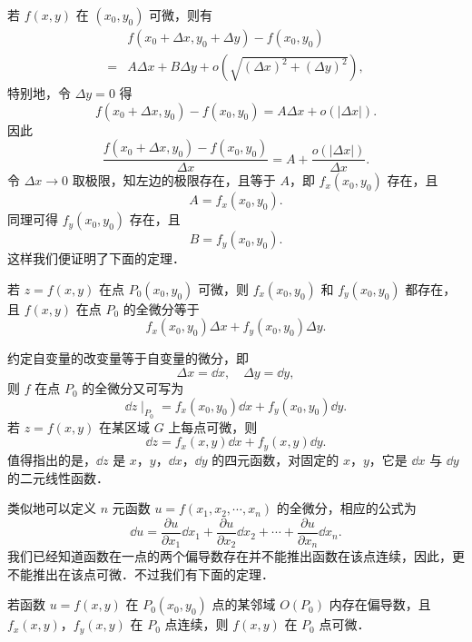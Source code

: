若 $f(x,y)$ 在 $(x_{0},y_{0})$ 可微，则有
\[
\begin{aligned}
&f(x_{0}+\Delta x,y_{0}+\Delta y)-f(x_{0},y_{0})\\
={}&A\Delta x+B\Delta y+o\left(\sqrt{(\Delta x)^{2}+(\Delta y)^{2}}\right),
\end{aligned}
\]
特别地，令 $\Delta y=0$ 得
\[
f(x_{0}+\Delta x,y_{0})-f(x_{0},y_{0})=A\Delta x+o(\left|\Delta x\right|).
\]
因此
\[
\frac{f(x_{0}+\Delta x,y_{0})-f(x_{0},y_{0})}{\Delta x}=A+\frac{o(\left|\Delta x\right|)}{\Delta x}.
\]
令 $\Delta x\to 0$ 取极限，知左边的极限存在，且等于 $A$，即 $f_{x}(x_{0},y_{0})$ 存在，且
\[
A=f_{x}(x_{0},y_{0}).
\]
同理可得 $f_{y}(x_{0},y_{0})$ 存在，且
\[
B=f_{y}(x_{0},y_{0}).
\]
这样我们便证明了下面的定理．

\begin{theorem}\label{thm:16-2}
若 $z=f(x,y)$ 在点 $P_{0}(x_{0},y_{0})$ 可微，则 $f_{x}(x_{0},y_{0})$ 和 $f_{y}(x_{0},y_{0})$ 都存在，且 $f(x,y)$ 在点 $P_{0}$ 的全微分等于
\[
f_{x}(x_{0},y_{0})\Delta x+f_{y}(x_{0},y_{0})\Delta y.
\]
\end{theorem}

约定自变量的改变量等于自变量的微分，即
\[
\Delta x=\dd x,\quad \Delta y=\dd y,
\]
则 $f$ 在点 $P_{0}$ 的全微分又可写为
\[
\dd z\mid_{P_{0}}=f_{x}(x_{0},y_{0})\dd x+f_{y}(x_{0},y_{0})\dd y.
\]
若 $z=f(x,y)$ 在某区域 $G$ 上每点可微，则
\[
\dd z=f_{x}(x,y)\dd x+f_{y}(x,y)\dd y.
\]
值得指出的是，$\dd z$ 是 $x$，$y$，$\dd x$，$\dd y$ 的四元函数，对固定的 $x$，$y$，它是 $\dd x$ 与 $\dd y$ 的二元线性函数．

类似地可以定义 $n$ 元函数 $u=f(x_{1},x_{2},\cdots,x_{n})$ 的全微分，相应的公式为
\[
\dd u=\frac{\partial u}{\partial x_{1}}\dd x_{1}+\frac{\partial u}{\partial x_{2}}\dd x_{2}+\cdots+\frac{\partial u}{\partial x_{n}}\dd x_{n}.
\]
我们已经知道函数在一点的两个偏导数存在并不能推出函数在该点连续，因此，更不能推出在该点可微．不过我们有下面的定理．

\begin{theorem}\label{thm:16-3}
若函数 $u=f(x,y)$ 在 $P_{0}(x_{0},y_{0})$ 点的某邻域 $O(P_{0})$ 内存在偏导数，且 $f_{x}(x,y)$，$f_{y}(x,y)$ 在 $P_{0}$ 点连续，则 $f(x,y)$ 在 $P_{0}$ 点可微．
\end{theorem}

